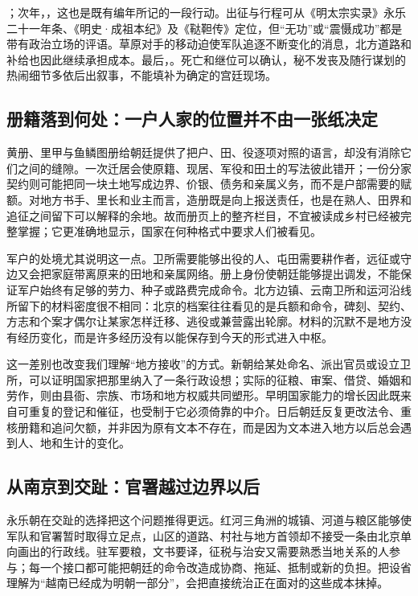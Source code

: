 ；次年，，这也是既有编年所记的一段行动。出征与行程可从《明太宗实录》永乐二十一年条、《明史·成祖本纪》及《鞑靼传》定位，但“无功”或“震慑成功”都是带有政治立场的评语。草原对手的移动迫使军队追逐不断变化的消息，北方道路和补给也因此继续承担成本。最后，。死亡和继位可以确认，秘不发丧及随行谋划的热闹细节多依后出叙事，不能填补为确定的宫廷现场。

\subsection{册籍落到何处：一户人家的位置并不由一张纸决定}

黄册、里甲与鱼鳞图册给朝廷提供了把户、田、役逐项对照的语言，却没有消除它们之间的缝隙。一次迁居会使原籍、现居、军役和田土的写法彼此错开；一份分家契约则可能把同一块土地写成边界、价银、债务和亲属义务，而不是户部需要的赋额。对地方书手、里长和业主而言，造册既是向上报送责任，也是在熟人、田界和追征之间留下可以解释的余地。故而册页上的整齐栏目，不宜被读成乡村已经被完整掌握；它更准确地显示，国家在何种格式中要求人们被看见。

军户的处境尤其说明这一点。卫所需要能够出役的人、屯田需要耕作者，远征或守边又会把家庭带离原来的田地和亲属网络。册上身份使朝廷能够提出调发，不能保证军户始终有足够的劳力、种子或路费完成命令。北方边镇、云南卫所和运河沿线所留下的材料密度很不相同：北京的档案往往看见的是兵额和命令，碑刻、契约、方志和个案才偶尔让某家怎样迁移、逃役或兼营露出轮廓。材料的沉默不是地方没有经历变化，而是许多经历没有以能保存到今天的形式进入中枢。

这一差别也改变我们理解“地方接收”的方式。新朝给某处命名、派出官员或设立卫所，可以证明国家把那里纳入了一条行政设想；实际的征粮、审案、借贷、婚姻和劳作，则由县衙、宗族、市场和地方权威共同塑形。早明国家能力的增长因此既来自可重复的登记和催征，也受制于它必须倚靠的中介。日后朝廷反复更改法令、重核册籍和追问欠额，并非因为原有文本不存在，而是因为文本进入地方以后总会遇到人、地和生计的变化。

\subsection{从南京到交趾：官署越过边界以后}

永乐朝在交趾的选择把这个问题推得更远。红河三角洲的城镇、河道与粮区能够使军队和官署暂时取得立足点，山区的道路、村社与地方首领却不接受一条由北京单向画出的行政线。驻军要粮，文书要译，征税与治安又需要熟悉当地关系的人参与；每一个接口都可能把朝廷的命令改造成协商、拖延、抵制或新的负担。把设省理解为“越南已经成为明朝一部分”，会把直接统治正在面对的这些成本抹掉。

